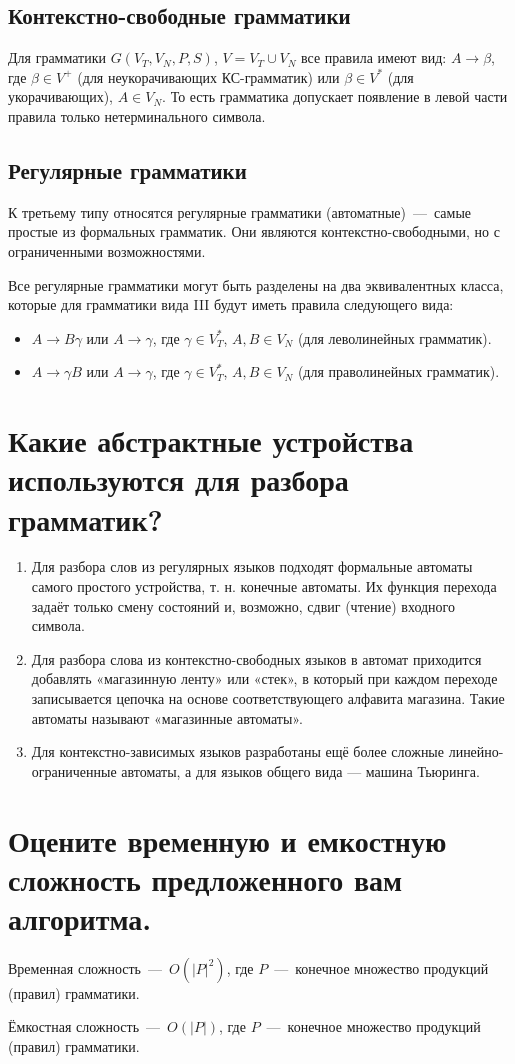 \subsection{Контекстно-свободные грамматики}
Для грамматики $G(V_{T},V_{N},P,S)$, $V=V_{T}\cup V_{N}$ все правила имеют вид: $A\rightarrow \beta$, где $\beta \in V^{+}$ (для неукорачивающих КС-грамматик) или $\beta \in V^{*}$ (для укорачивающих), 
$A\in V_{N}$. То есть грамматика допускает появление в левой части правила только нетерминального символа.

\subsection{Регулярные грамматики}
К третьему типу относятся регулярные грамматики (автоматные)~---~самые простые из формальных грамматик. Они являются контекстно-свободными, но с ограниченными возможностями.

Все регулярные грамматики могут быть разделены на два эквивалентных класса, которые для грамматики вида III будут иметь правила следующего вида:
\begin{itemize}
	\item $A\rightarrow B\gamma$ или $A\rightarrow \gamma$, где $\gamma \in V_{T}^{*}$, $A,B\in V_{N}$ (для леволинейных грамматик).
	\item $A\rightarrow \gamma B$ или $A\rightarrow \gamma$, где $\gamma \in V_{T}^{*}$, $A,B\in V_{N}$ (для праволинейных грамматик).
\end{itemize}

\section{Какие абстрактные устройства используются для разбора грамматик?}
\begin{enumerate}
	\item Для разбора слов из регулярных языков подходят формальные автоматы самого простого устройства, т. н. конечные автоматы. Их функция перехода задаёт только смену состояний и, возможно, сдвиг (чтение) входного символа.
	\item Для разбора слова из контекстно-свободных языков в автомат приходится добавлять «магазинную ленту» или «стек», в который при каждом переходе записывается цепочка на основе соответствующего алфавита магазина. Такие автоматы называют «магазинные автоматы».
	\item Для контекстно-зависимых языков разработаны ещё более сложные линейно-ограниченные автоматы, а для языков общего вида — машина Тьюринга.
\end{enumerate}

\section{Оцените временную и емкостную сложность предложенного вам алгоритма.}

Временная сложность~---~$O(|P|^2)$, где $P$~---~конечное множество продукций (правил) грамматики.

Ёмкостная сложность~---~$O(|P|)$, где $P$~---~конечное множество продукций (правил) грамматики.
